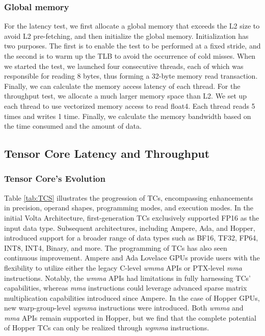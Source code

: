 \subsubsection{Global memory} For the latency test, we first allocate a global memory that exceeds the L2 size to avoid L2 pre-fetching, and then initialize the global memory. Initialization has two purposes. The first is to enable the test to be performed at a fixed stride, and the second is to warm up the TLB to avoid the occurrence of cold misses. When we started the test, we launched four consecutive threads, each of which was responsible for reading 8 bytes, thus forming a 32-byte memory read transaction. Finally, we can calculate the memory access latency of each thread. For the throughput test, we allocate a much larger memory space than L2. We set up each thread to use vectorized memory access to read float4. Each thread reads 5 times and writes 1 time. Finally, we calculate the memory bandwidth based on the time consumed and the amount of data.

\subsection{Tensor Core Latency and Throughput}
\subsubsection{Tensor Core's Evolution}\label{sec:evo_tc}

Table \ref{tab:TCS} illustrates the progression of TCs, encompassing enhancements in precision, operand shapes, programming modes, and execution modes. In the initial Volta Architecture, first-generation TCs exclusively supported FP16 as the input data type. Subsequent architectures, including Ampere, Ada, and Hopper, introduced support for a broader range of data types such as BF16, TF32, FP64, INT8, INT4, Binary, and more. The programming of TCs has also seen continuous improvement. Ampere and Ada Lovelace GPUs provide users with the flexibility to utilize either the legacy C-level \emph{wmma} APIs or PTX-level \emph{mma} instructions. Notably, the \emph{wmma} APIs had limitations in fully harnessing TCs' capabilities, whereas \emph{mma} instructions could leverage advanced sparse matrix multiplication capabilities introduced since Ampere. In the case of Hopper GPUs, new warp-group-level \emph{wgmma} instructions were introduced. Both \emph{wmma} and \emph{mma} APIs remain supported in Hopper, but we find that the complete potential of Hopper TCs can only be realized through \emph{wgmma} instructions.

